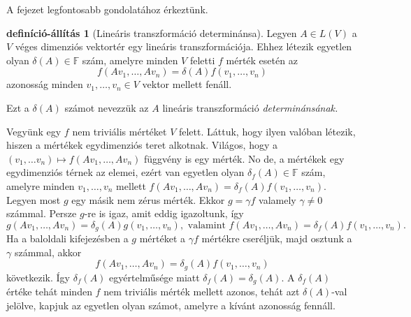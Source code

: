 \documentclass[a4paper, showtrims]{memoir}
\makeatletter
\renewenvironment{proof}[1][\proofname]
    {\par\pushQED{\qed}%
    \normalfont \topsep6\p@\@plus6\p@\relax
    \trivlist
    \item[\hskip\labelsep
        \itshape
    #1\@addpunct{:}]\ignorespaces}
    {\popQED\endtrivlist\@endpefalse}
\theoremstyle{plain}
\theoremstyle{remark}
\theoremstyle{definition}
\newtheorem{defprop}[proposition]{definíció-állítás}
\makeatother
\begin{document}
A fejezet legfontosabb gondolatához érkeztünk.
\begin{defprop}[Lineáris transzformáció determinánsa]
	Legyen $A\in L\left( V \right)$ a $V$ véges dimenziós vektortér egy lineáris transzformációja.
	Ehhez létezik egyetlen olyan $\delta\left( A \right)\in\mathbb{F}$ szám,
	amelyre minden $V$ feletti $f$ mérték esetén az
	\[
		f\left( Av_1,\ldots,Av_n \right)
		=
		\delta\left( A \right)
		f\left( v_1,\ldots,v_n \right)
	\]
	azonosság minden $v_1,\ldots,v_n\in V$ vektor mellett fenáll.

	Ezt a $\delta\left( A \right)$ számot nevezzük az $A$ lineáris transzformáció \emph{determinánsának.}
\end{defprop}
\begin{proof}
	Vegyünk egy $f$ nem triviális mértéket $V$ felett.
	Láttuk, hogy ilyen valóban létezik, hiszen a mértékek egydimenziós teret alkotnak.
	Világos, hogy a $\left( v_1,\ldots v_{n}\right) \mapsto f\left( Av_{1},\ldots ,Av_{n}\right) $
	függvény is egy mérték.
	No de, a mértékek egy egydimenziós térnek az elemei,
	ezért van egyetlen olyan $\delta _{f}\left( A\right)\in\mathbb{F} $ szám,
	amelyre minden
	$
		v_{1},\ldots ,v_{n}
	$
	mellett
	$
		f\left( Av_{1},\ldots,Av_{n}\right)
		=
		\delta _{f}\left( A\right) f\left( v_{1},\ldots,v_{n}\right)
	$.
	Legyen most $g$ egy másik nem zérus mérték.
	Ekkor
	$g=\gamma f$ valamely $\gamma\neq 0$ számmal.
	Persze $g$-re is igaz, amit eddig igazoltunk,
	így
	\begin{displaymath}
		g\left( Av_{1},\ldots ,Av_{n}\right)
		=
		\delta_{g}\left( A\right) g\left( v_{1},\ldots ,v_{n}\right),
		\text{ valamint }
		f\left( Av_{1},\ldots,Av_{n}\right)
		=
		\delta _{f}\left( A\right) f\left( v_{1},\ldots,v_{n}\right).
	\end{displaymath}
	Ha a baloldali kifejezésben a $g$ mértéket a $\gamma f$ mértékre cseréljük,
	majd osztunk a $\gamma$ számmal,
	akkor
	\[
		f\left(Av_{1},\ldots ,Av_{n}\right)
		=
		\delta _{g}\left( A\right) f\left(v_{1},\ldots ,v_{n}\right)
	\]
	következik.
	Így $\delta _{f}\left( A\right) $ egyértelműsége miatt
	$
		\delta _{f}\left( A\right) =\delta _{g}\left( A\right).
	$
	A $\delta_f\left( A \right)$ értéke tehát minden $f$ nem triviális mérték mellett azonos,
	tehát azt $\delta(A)$-val jelölve, kapjuk az egyetlen olyan számot,
	amelyre a kívánt azonosság fennáll.
\end{proof}
\end{document}
